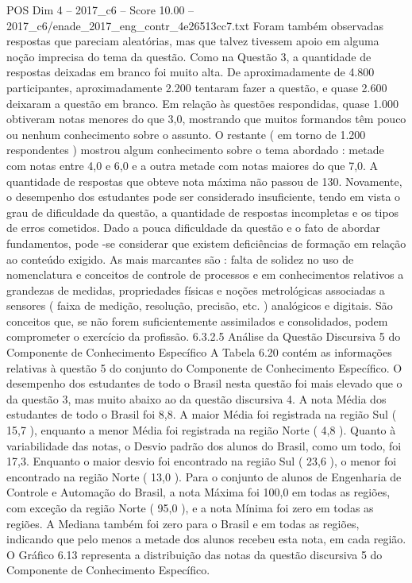 \begin{textsample}{POS Dim 4 – 2017\_c6 – Score 10.00 – 2017\_c6/enade\_2017\_eng\_contr\_4e26513cc7.txt}
Foram também observadas respostas que pareciam aleatórias, mas que talvez tivessem apoio em alguma noção imprecisa do tema da questão.
Como na Questão 3, a quantidade de respostas deixadas em branco foi muito alta.
De aproximadamente de 4.800 participantes, aproximadamente 2.200 tentaram fazer a questão, e quase 2.600 deixaram a questão em branco.
Em relação às questões respondidas, quase 1.000 obtiveram notas menores do que 3,0, mostrando que muitos formandos têm pouco ou nenhum conhecimento sobre o assunto.
O restante ( em torno de 1.200 respondentes ) mostrou algum conhecimento sobre o tema abordado : metade com notas entre 4,0 e 6,0 e a outra metade com notas maiores do que 7,0.
A quantidade de respostas que obteve nota máxima não passou de 130.
Novamente, o desempenho dos estudantes pode ser considerado insuficiente, tendo em vista o grau de dificuldade da questão, a quantidade de respostas incompletas e os tipos de erros cometidos.
Dado a pouca dificuldade da questão e o fato de abordar fundamentos, pode -se considerar que existem deficiências de formação em relação ao conteúdo exigido.
As mais marcantes são : falta de solidez no uso de nomenclatura e conceitos de controle de processos e em conhecimentos relativos a grandezas de medidas, propriedades físicas e noções metrológicas associadas a sensores ( faixa de medição, resolução, precisão, etc. ) analógicos e digitais.
São conceitos que, se não forem suficientemente assimilados e consolidados, podem comprometer o exercício da profissão. 6.3.2.5 Análise da Questão Discursiva 5 do Componente de Conhecimento Específico A Tabela 6.20 contém as informações relativas à questão 5 do conjunto do Componente de Conhecimento Específico.
O desempenho dos estudantes de todo o Brasil nesta questão foi mais elevado que o da questão 3, mas muito abaixo ao da questão discursiva 4.
A nota Média dos estudantes de todo o Brasil foi 8,8.
A maior Média foi registrada na região Sul ( 15,7 ), enquanto a menor Média foi registrada na região Norte ( 4,8 ).
Quanto à variabilidade das notas, o Desvio padrão dos alunos do Brasil, como um todo, foi 17,3.
Enquanto o maior desvio foi encontrado na região Sul ( 23,6 ), o menor foi encontrado na região Norte ( 13,0 ).
Para o conjunto de alunos de Engenharia de Controle e Automação do Brasil, a nota Máxima foi 100,0 em todas as regiões, com exceção da região Norte ( 95,0 ), e a nota Mínima foi zero em todas as regiões.
A Mediana também foi zero para o Brasil e em todas as regiões, indicando que pelo menos a metade dos alunos recebeu esta nota, em cada região.
O Gráfico 6.13 representa a distribuição das notas da questão discursiva 5 do Componente de Conhecimento Específico.

\end{textsample}
